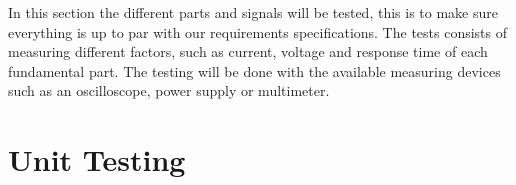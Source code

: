 In this section the different parts and signals will be tested, this is to make sure everything is up to par with our requirements specifications. The tests consists of measuring different factors, such as current, voltage and response time of each fundamental part. The testing will be done with the available measuring devices such as an oscilloscope, power supply or multimeter.

\section{Unit Testing}
 




